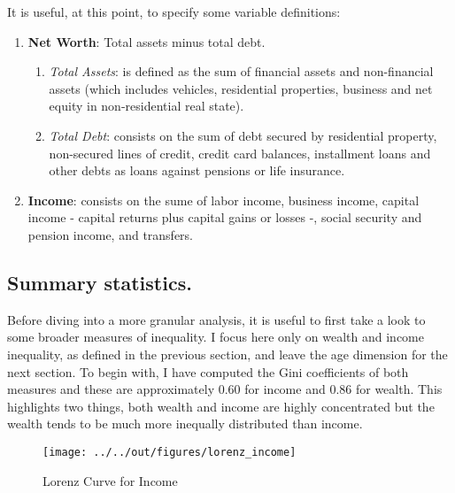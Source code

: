 \documentclass[11pt, a4paper, leqno]{article}
\begin{document}
It is useful, at this point, to specify some variable definitions:

\begin{enumerate}
    \item \textbf{Net Worth}: Total assets minus total debt.
    \begin{enumerate}
        \item \textit{Total Assets}: is defined as the sum of financial assets and non-financial assets (which includes vehicles, residential properties, business and net equity in non-residential real state).

        \item \textit{Total Debt}: consists on the sum of debt secured by residential property, non-secured lines of credit, credit card balances, installment loans and other debts as loans against pensions or life insurance.
    
    \end{enumerate}

    \item \textbf{Income}: consists on the sume of labor income, business income, capital income - capital returns plus capital gains or losses -, social security and pension income, and transfers.

\end{enumerate}

\subsection*{Summary statistics.}

Before diving into a more granular analysis, it is useful to first take a look to some broader measures of inequality. I focus here only on wealth and income inequality, as defined in the previous section, and leave the age dimension for the next section. To begin with, I have computed the Gini coefficients of both measures and these are approximately $0.60$ for income and $0.86$ for wealth. This highlights two things, both wealth and income are highly concentrated but the wealth tends to be much more inequally distributed than income.

\begin{figure}[H]
    \caption{Lorenz Curve for Income}
    
    \texttt{[image: ../../out/figures/lorenz\_income]}
    \label{fig:lorincome}
\end{figure}
\end{document}
